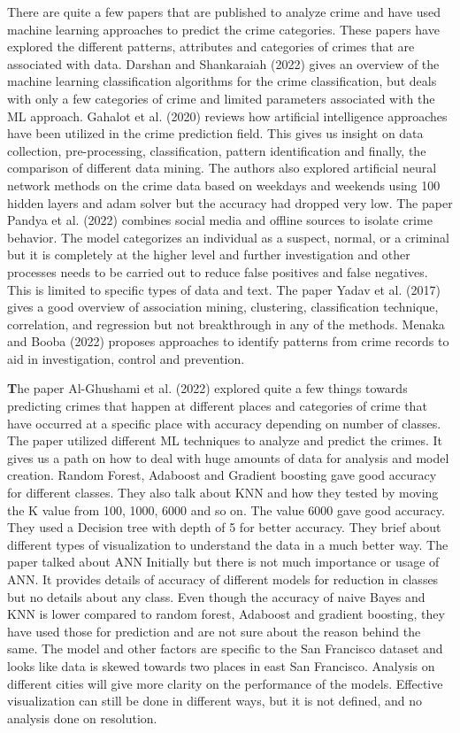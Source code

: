 \documentclass[conference,final,]{IEEEtran}
\begin{document}
There are quite a few papers that are published to analyze crime and
have used machine learning approaches to predict the crime categories.
These papers have explored the different patterns, attributes and
categories of crimes that are associated with data. Darshan and
Shankaraiah (2022) gives an overview of the machine learning
classification algorithms for the crime classification, but deals with
only a few categories of crime and limited parameters associated with
the ML approach. Gahalot et al. (2020) reviews how artificial
intelligence approaches have been utilized in the crime prediction
field. This gives us insight on data collection, pre-processing,
classification, pattern identification and finally, the comparison of
different data mining. The authors also explored artificial neural network 
methods on the crime data based on weekdays and weekends using 100 hidden layers
and adam solver but the accuracy had dropped very low. The paper 
Pandya et al. (2022) combines social media and offline sources to isolate crime
behavior. The model categorizes an individual as a suspect, normal, or
a criminal but it is completely at the higher level and further
investigation and other processes needs to be carried out to reduce
false positives and false negatives. This is limited to specific types
of data and text. The paper Yadav et al. (2017) gives a good overview of
association mining, clustering, classification technique, correlation,
and regression but not breakthrough in any of the methods. Menaka and
Booba (2022) proposes approaches to identify patterns from crime records
to aid in investigation, control and prevention.  

\textbf The paper Al-Ghushami et al. (2022) explored quite a few things
towards predicting crimes that happen at different places and categories
of crime that have occurred at a specific place with accuracy depending on
number of classes. The paper utilized different ML techniques to analyze 
and predict the crimes. It gives us a path on how to deal with huge amounts
of data for analysis and model creation. Random Forest, Adaboost and
Gradient boosting gave good accuracy for different classes. They also
talk about KNN and how they tested by moving the K value from 100, 1000,
6000 and so on. The value 6000 gave good accuracy. They used a Decision
tree with depth of 5 for better accuracy. They brief about different
types of visualization to understand the data in a much better way. The paper 
talked about ANN Initially but there is not much importance or usage of ANN. 
It provides details of accuracy of different models for reduction in
classes but no details about any class. Even though the accuracy of
naive Bayes and KNN is lower compared to random forest, Adaboost and
gradient boosting, they have used those for prediction and are not sure
about the reason behind the same. The model and other factors are
specific to the San Francisco dataset and looks like data is skewed
towards two places in east San Francisco. Analysis on different cities
will give more clarity on the performance of the models. Effective
visualization can still be done in different ways, but it is not
defined, and no analysis done on resolution.
\end{document}
